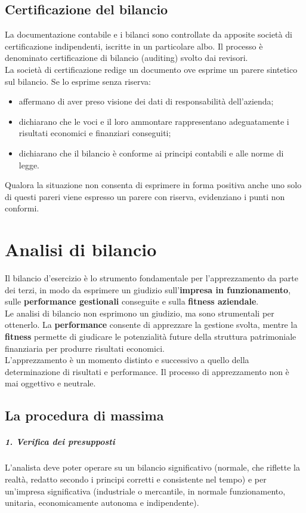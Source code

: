\documentclass{report}
\begin{document}
	\section{Certificazione del bilancio}
	La documentazione contabile e i bilanci sono controllate da apposite società di certificazione indipendenti, iscritte in un particolare albo. Il processo è denominato certificazione di bilancio (auditing) svolto dai revisori.
	\medskip \\La società di certificazione redige un documento ove esprime un parere sintetico sul bilancio. Se lo esprime senza riserva:
	\begin{itemize}
		\item affermano di aver preso visione dei dati di responsabilità dell'azienda;
		\item dichiarano che le voci e il loro ammontare rappresentano adeguatamente i risultati economici e finanziari conseguiti;
		\item dichiarano che il bilancio è conforme ai principi contabili e alle norme di legge.
	\end{itemize}
	Qualora la situazione non consenta di esprimere in forma positiva anche uno solo di questi pareri viene espresso un parere con riserva, evidenziano i punti non conformi.
	\chapter{Analisi di bilancio}
	Il bilancio d'esercizio è lo strumento fondamentale per l'apprezzamento da parte dei terzi, in modo da esprimere un giudizio sull'\textbf{impresa in funzionamento}, sulle \textbf{performance gestionali} conseguite e sulla \textbf{fitness aziendale}.
	\medskip \\
	Le analisi di bilancio non esprimono un giudizio, ma sono strumentali per ottenerlo. La \textbf{performance} consente di apprezzare la gestione svolta, mentre la \textbf{fitness} permette di giudicare le potenzialità future della struttura patrimoniale finanziaria per produrre risultati economici.
	\medskip \\
	L'apprezzamento è un momento distinto e successivo a quello della determinazione di risultati e performance. Il processo di apprezzamento non è mai oggettivo e neutrale.
	\section{La procedura di massima}
	\paragraph{1. Verifica dei presupposti} L'analista deve poter operare su un bilancio significativo (normale, che riflette la realtà, redatto secondo i principi corretti e consistente nel tempo) e per un'impresa significativa (industriale o mercantile, in normale funzionamento, unitaria, economicamente autonoma e indipendente).
\end{document}
